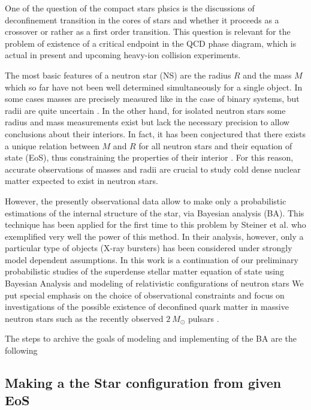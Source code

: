 {One of the question of the compact stars phsics is the discussions
of deconfinement transition in the cores of stars and whether it proceeds
as a crossover or rather as a first order transition. This question
is relevant for the problem of existence of a critical endpoint in
the QCD phase diagram, which is actual in present and upcoming heavy-ion
collision experiments.}

{The most basic features of a neutron star (NS) are the radius
$R$ and the mass $M$ which so far have not been well determined
simultaneously for a single object. In some cases masses are precisely
measured like in the case of binary systems, but radii are quite uncertain
\cite{Miller:2013tca}. In the other hand, for isolated neutron stars
some radius and mass measurements exist but lack the necessary precision
to allow conclusions about their interiors. In fact, it has been conjectured
that there exists a unique relation between $M$ and $R$ for all
neutron stars and their equation of state (EoS), thus constraining
the properties of their interior \cite{Lindblom1984}. For this reason,
accurate observations of masses and radii are crucial to study cold
dense nuclear matter expected to exist in neutron stars.}

{However, the presently observational data allow to make only
a probabilistic estimations of the internal structure of the star,
via Bayesian analysis (BA). This technique has been applied for the
first time to this problem by Steiner et al. \cite{Steiner:2010fz}
who exemplified very well the power of this method. In their analysis,
however, only a particular type of objects (X-ray bursters) has been
considered under strongly model dependent assumptions. In this work
is a continuation of our preliminary probabilistic studies of the
superdense stellar matter equation of state using Bayesian Analysis
and modeling of relativistic configurations of neutron stars \cite{Alvarez-Castillo:2014xea,Blaschke:2014via}
We put special emphasis on the choice of observational constraints
and focus on investigations of the possible existence of deconfined
quark matter in massive neutron stars such as the recently observed
$2~M_{\odot}$ pulsars \cite{Demorest:2010bx,Antoniadis:2013pzd}.}

The steps to archive the goals of modeling and implementing of the BA
are the following


\subsection{Making a the Star configuration from given EoS}

